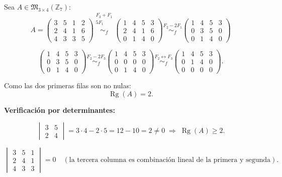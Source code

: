 \documentclass[a4paper,12pt]{article}
\begin{document}
\begin{ejemplo}
Sea $A \in \mathfrak{M}_{3 \times 4}(\mathbb{Z}_7)$:
\[
A=
\begin{pmatrix}
3 & 5 & 1 & 2 \\
2 & 4 & 1 & 6 \\
4 & 3 & 3 & 5
\end{pmatrix}
\overset{\substack{F_3+F_1 \\ 5F_1\\{}}}{\sim_f}
\begin{pmatrix}
1 & 4 & 5 & 3 \\
2 & 4 & 1 & 6 \\
0 & 1 & 4 & 0
\end{pmatrix}
\overset{F_2-2F_1}{\sim_f}
\begin{pmatrix}
1 & 4 & 5 & 3 \\
0 & 3 & 5 & 0 \\
0 & 1 & 4 & 0
\end{pmatrix}
\]

\[
\begin{pmatrix}
1 & 4 & 5 & 3 \\
0 & 3 & 5 & 0 \\
0 & 1 & 4 & 0
\end{pmatrix}
\overset{F_2-2F_3}{\sim_f}
\begin{pmatrix}
1 & 4 & 5 & 3 \\
0 & 0 & 0 & 0 \\
0 & 1 & 4 & 0
\end{pmatrix}
\overset{F_2 \leftrightarrow F_3}{\sim_f}
\begin{pmatrix}
1 & 4 & 5 & 3 \\
0 & 1 & 4 & 0 \\
0 & 0 & 0 & 0
\end{pmatrix}.
\]

\vspace{0.5em}

Como las dos primeras filas son no nulas:  
\[
\operatorname{Rg}(A) = 2.
\]

\medskip
\textbf{Verificación por determinantes:}

\[
\begin{vmatrix}
3 & 5 \\
2 & 4
\end{vmatrix}
= 3\cdot 4 - 2\cdot 5 = 12 - 10 = 2 \neq 0 \;\Rightarrow\; \operatorname{Rg}(A)\ge 2.
\]

\[
\begin{vmatrix}
3 & 5 & 1 \\
2 & 4 & 1 \\
4 & 3 & 3
\end{vmatrix}
= 0
\quad
(\text{la tercera columna es combinación lineal de la primera y segunda}).
\]


\end{ejemplo}
\end{document}
